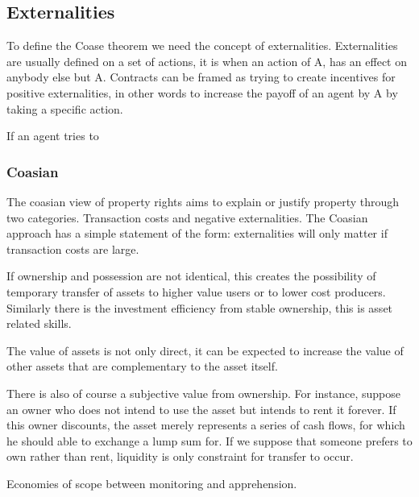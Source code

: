 \documentclass[12pt]{article}
\numberwithin{equation}{section}
\begin{document}
\subsection{Externalities}

To define the Coase theorem we need the concept of externalities. Externalities are usually defined on a set of actions, it is when an action of A, has an effect on anybody else but A. Contracts can be framed as trying to create incentives for positive externalities, in other words to increase the payoff of an agent by A by taking a specific action.  

If an agent tries to 

\subsubsection{Coasian}




The coasian view of property rights aims to explain or justify property through two categories. Transaction costs and negative externalities. The Coasian approach has a simple statement of the form: externalities will only matter if transaction costs are large. 

If ownership and possession are not identical, this creates the possibility of temporary transfer of assets to higher value users or to lower cost producers. Similarly there is the investment efficiency from stable ownership, this is asset related skills.

The value of assets is not only direct, it can be expected to increase the value of other assets that are complementary to the asset itself.  

There is also of course a subjective value from ownership. For instance, suppose an owner who does not intend to use the asset but intends to rent it forever. If this owner discounts, the asset merely represents a series of cash flows, for which he should able to exchange a lump sum for. If we suppose that someone prefers to own rather than rent, liquidity is only constraint for transfer to occur. 

Economies of scope between monitoring and apprehension. 


\end{document}
